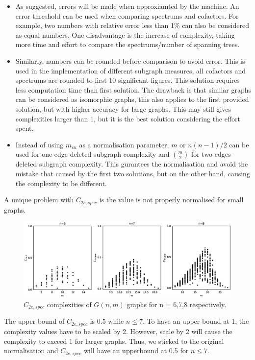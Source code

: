 \documentclass[12pt]{article}
\begin{document}
\begin{itemize}
    \item As suggested, errors will be made when approxiamted by the machine. An error threshold can be used when comparing spectrums and cofactors. For example, two numbers with relative error less than 1\% can also be considered as equal numbers. One disadvantage is the increase of complexity, taking more time and effort to compare the spectrums/number of spanning trees.
    \item Similarly, numbers can be rounded before comparison to avoid error. This is used in the implementation of different subgraph measures, all cofactors and spectrums are rounded to first 10 significant figures. This solution requires less computation time than first solution. The drawback is that similar graphs can be considered as isomorphic graphs, this also applies to the first provided solution, but with higher accuracy for large graphs. This may still gives complexities larger than 1, but it is the best solution considering the effort spent.
    \item Instead of using $m_{cu}$ as a normalisation parameter, $m$ or $n(n-1)/2$ can be used for one-edge-deleted subgraph complexity and $\genfrac(){0pt}{2}{m}{2}$ for two-edges-deleted subgraph complexity. This gurantees the normalisation and avoid the mistake that caused by the first two solutions, but on the other hand, causing the complexity to be different.
\end{itemize}
A unique problem with $C_{2e,spec}$ is the value is not properly normalised for small graphs.

\begin{figure}[ht]
    \includegraphics[width = \textwidth]{c2espec.eps}
    \caption{$C_{2e,spec}$ complexities of $G(n,m)$ graphs for n = 6,7,8 respectively.}
    \centering
\end{figure}
\noindent
The upper-bound of $C_{2e,spec}$ is 0.5 while $ n\leq7 $. To have an upper-bound at 1, the complexity values have to be scaled by 2. However, scale by 2 will cause the complexity to exceed 1 for larger graphs. Thus, we sticked to the original normalisation and $C_{2e,spec}$ will have an upperbound at 0.5 for $n \leq 7$.
\end{document}
